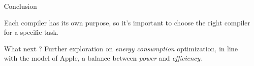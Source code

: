 \documentclass{beamer}
\begin{document}
    \begin{frame}{Conclusion}
        \begin{block}{}
            Each compiler has its own purpose, so it's important to choose the right compiler for a specific task.
        \end{block}
        \begin{block}{What next ?}
            Further exploration on \textit{energy consumption} optimization, in line with the model of Apple, a balance between \textit{power} and \textit{efficiency}.
        \end{block}
    \end{frame}
    
\end{document}
